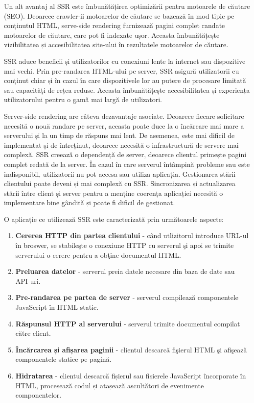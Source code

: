 \documentclass[12pt, a4paper]{report}
\begin{document}
Un alt avantaj al SSR este îmbunătățirea optimizării pentru motoarele de căutare (SEO). Deoarece crawler-ii motoarelor de căutare se bazează în mod tipic pe conținutul HTML, serve-side rendering furnizează pagini complet randate motoarelor de căutare, care pot fi indexate ușor. Aceasta îmbunătățește vizibilitatea și accesibilitatea site-ului în rezultatele motoarelor de căutare.

SSR aduce beneficii și utilizatorilor cu conexiuni lente la internet sau dispozitive mai vechi. Prin pre-randarea HTML-ului pe server, SSR asigură utilizatorii cu conținut chiar și în cazul în care dispozitivele lor au putere de procesare limitată sau capacități de rețea reduse. Aceasta îmbunătățește accesibilitatea și experiența utilizatorului pentru o gamă mai largă de utilizatori.

Server-side rendering are c\^ateva dezavantaje asociate. Deoarece fiecare solicitare necesită o nouă randare pe server, aceasta poate duce la o încărcare mai mare a serverului și la un timp de răspuns mai lent. De asemenea, este mai dificil de implementat și de întreținut, deoarece necesită o infrastructură de servere mai complexă. SSR creează o dependență de server, deoarece clientul primește pagini complet redată de la server. În cazul în care serverul întâmpină probleme sau este indisponibil, utilizatorii nu pot accesa sau utiliza aplicația.
Gestionarea stării clientului poate deveni și mai complexă cu SSR. Sincronizarea și actualizarea stării între client și server pentru a menține coerența aplicației necesită o implementare bine gândită și poate fi dificil de gestionat.

O aplicație ce utilizează SSR este caracterizat\u a prin următoarele aspecte:

\begin{enumerate}
	\item \textbf{Cererea HTTP din partea clientului} - c\^and utlizitorul introduce URL-ul \^in broswer, se stabile\c ste o conexiune HTTP cu serverul \c si apoi se trimite serverului o cerere pentru a ob\c tine documentul HTML.
	\item \textbf{Preluarea datelor} - serverul preia datele necesare din baza de date sau API-uri.
	\item \textbf{Pre-randarea pe partea de server} - serverul compileaz\u a componentele JavaScript \^in HTML static.
	\item \textbf{Răspunsul HTTP al serverului} - serverul trimite documentul compilat c\u atre client.
	\item \textbf{Încărcarea și afișarea paginii} - clientul descarc\u a fi\c sierul HTML \c si afi\c seaz\u a componentele statice pe pagină.
	\item \textbf{Hidratarea} - clientul descarcă fișierul sau fișierele JavaScript încorporate în HTML, procesează codul și atașează ascultători de evenimente componentelor.
\end{enumerate} \cite{improve-ssr-speed}
\end{document}

